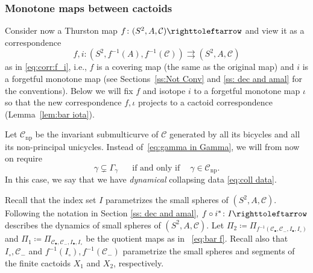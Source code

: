 \documentclass{amsart}
\theoremstyle{plain}
\theoremstyle{definition}
\theoremstyle{remark}
\newcommand{\reminder}[1]{\textsl{$\lhd\rhd$#1$\lhd\rhd$}\marginpar{$\lhd\rhd\lhd\rhd\lhd\rhd$}}%
\newcommand{\hide}[1]{}
\renewcommand{\sp}{{\ \ }}
\newcommand{\CC}{{\mathcal C}}
\newcommand\selfmap{\righttoleftarrow}
\begin{document}
\subsubsection{Monotone maps between cactoids} 
\label{sss:MonotMapsCact}
 Consider now a Thurston map $f\colon (S^2,A,\CC)\selfmap$ and view it as a correspondence
\[f, i \colon (S^2,f^{-1}(A),f^{-1}(\CC)) \rightrightarrows (S^2,A,\CC)\] as in \eqref{eq:corr:f_i}, i.e., $f$ is a covering map (the same as the original map) and $i$ is a forgetful monotone map  (see Sections~\ref{ss:Not Conv} and \ref{ss: dec and amal} for the conventions). Below we will fix $f$ and isotope $i$ to a forgetful monotone map $\iota$ so that the new correspondence $f,\iota$ projects to a cactoid correspondence (Lemma~\ref{lem:bar iota}). 


Let $\CC_\text{np}$ be the invariant submulticurve of $\CC$ generated by all its bicycles and all its non-principal unicycles. Instead of~\eqref{eq:gamma in Gamma}, we will from now on require
\begin{equation}
   \label{eq:gamma in Gamma:2}  \gamma\subsetneq \Gamma_\gamma\sp\sp\sp\text{ if and only if }\sp \sp \gamma\in \CC_\text{np}. 
\end{equation}
In this case, we say that we have \emph{dynamical} collapsing data \eqref{eq:coll data}.



 
 
 Recall that the index set $I$ parametrizes the small spheres of $(S^2,A,\CC)$. Following the notation in Section \ref{ss: dec and amal}, $f\circ i^*\colon I\selfmap$ describes the dynamics of small spheres of $(S^2,A,\CC)$. Let  $\Pi_2\coloneq\Pi_{f^{-1}(\CC_\bullet, \CC_- , I_\bullet , I_\circ)} $ and $\Pi_1\coloneq\Pi_{ \CC_\bullet, \CC_- , I_\bullet , I_\circ }$ be the quotient maps as in ~\eqref{eq:bar f}. Recall also that $I_\circ, \CC_-$ and $f^{-1}(I_\circ), f^{-1}(\CC_-)$ parametrize the small spheres and segments of the finite cactoids $X_1$ and $X_2$, respectively.
\end{document}
